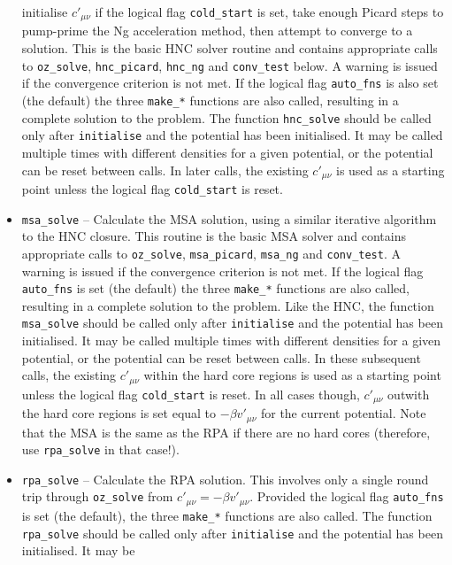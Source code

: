 \documentclass[12pt,a4paper]{article}
\begin{document}
\begin{itemize}
  initialise $c'_{\mu\nu}$ if the logical flag \verb+cold_start+ is
  set, take enough Picard steps to pump-prime the Ng acceleration
  method, then attempt to converge to a solution.  This is the basic
  HNC solver routine and contains appropriate calls to
  \verb+oz_solve+, \verb+hnc_picard+, \verb+hnc_ng+ and
  \verb+conv_test+ below.  A warning is issued if the convergence
  criterion is not met.  If the logical flag \verb+auto_fns+ is also
  set (the default) the three \verb+make_*+ functions are also called,
  resulting in a complete solution to the problem.  The function
  \verb+hnc_solve+ should be called only after \verb+initialise+ and
  the potential has been initialised.  It may be called multiple times
  with different densities for a given potential, or the potential can
  be reset between calls.  In later calls, the existing $c'_{\mu\nu}$
  is used as a starting point unless the logical flag \verb+cold_start+ is
  reset.
%
\item\verb+msa_solve+ -- Calculate the MSA solution, using a similar
  iterative algorithm to the HNC closure. This routine is the basic
  MSA solver and contains appropriate calls to \verb+oz_solve+,
  \verb+msa_picard+, \verb+msa_ng+ and \verb+conv_test+.  A warning is
  issued if the convergence criterion is not met.  If the logical flag
  \verb+auto_fns+ is set (the default) the three \verb+make_*+
  functions are also called, resulting in a complete solution to the
  problem.  Like the HNC, the function \verb+msa_solve+ should be
  called only after \verb+initialise+ and the potential has been
  initialised.  It may be called multiple times with different
  densities for a given potential, or the potential can be reset
  between calls.  In these subsequent calls, the existing
  $c'_{\mu\nu}$ within the hard core regions is used as a starting
  point unless the logical flag \verb+cold_start+ is reset. In all
  cases though, $c'_{\mu\nu}$ outwith the hard core regions is set
  equal to $-\beta v'_{\mu\nu}$ for the current potential. Note that
  the MSA is the same as the RPA if there are no hard cores
  (therefore, use \verb+rpa_solve+ in that case!).
%
\item\verb+rpa_solve+ -- Calculate the RPA solution.  This involves
  only a single round trip through \verb+oz_solve+ from $c'_{\mu\nu} =
  -\beta v'_{\mu\nu}$.  Provided the logical flag \verb+auto_fns+ is
  set (the default), the three \verb+make_*+ functions are also
  called. The function \verb+rpa_solve+ should be called only after
  \verb+initialise+ and the potential has been initialised.  It may be

\end{itemize}
\end{document}
